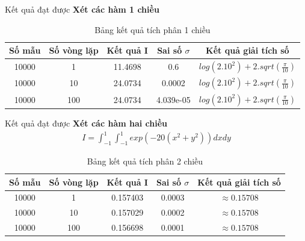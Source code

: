 \documentclass{beamer}
\begin{document}
\begin{frame}{Kết quả đạt được}\vspace{4pt}
  \textbf{Xét các hàm 1 chiều}\\
  \vspace{0.4em}
  \begin{table}[H]
    \centering
    \begin{tabular}{ |c|c|c|c|c| }
     \hline
     \multicolumn{1}{|c}{Số mẫu} & \multicolumn{1}{|c|}{Số vòng lặp} & \multicolumn{1}{|c|}{Kết quả I} & \multicolumn{1}{|c|}{Sai số $\sigma$} & \multicolumn{1}{|c|}{Kết quả giải tích số} \\
     \hline
     10000 & 1  & 11.4698 & 0.6 & $log(2.10^2) + 2.sqrt(\frac{\pi}{10})$ \\
     \hline
     10000 & 10  & 24.0734 & 0.0002 & $log(2.10^2) + 2.sqrt(\frac{\pi}{10})$ \\
     \hline
     10000 & 100  & 24.0734 & 4.039e-05 & $log(2.10^2) + 2.sqrt(\frac{\pi}{10})$ \\
     \hline
    \end{tabular}
    \caption{Bảng kết quả tích phân 1 chiều}
    \label{1d_x02505075}
   \end{table}
\end{frame}

\begin{frame}{Kết quả đạt được}\vspace{4pt}
  \textbf{Xét các hàm hai chiều}\\
  \vspace{0.4em}
  \begin{align}
    I=\int_{-1}^{1}\int_{-1}^{1} {exp(-20(x^2+y^2))}dxdy
\end{align}

\begin{table}[H]
    \centering
    \begin{tabular}{ |c|c|c|c|c| }
     \hline
     \multicolumn{1}{|c}{Số mẫu} & \multicolumn{1}{|c|}{Số vòng lặp} & \multicolumn{1}{|c|}{Kết quả I} & \multicolumn{1}{|c|}{Sai số $\sigma$} & \multicolumn{1}{|c|}{Kết quả giải tích số} \\
     \hline
     10000 & 1  & 0.157403  & 0.0003 & $\approx 0.15708$ \\
     \hline
     10000 & 10  &  0.157029 & 0.0002 & $\approx 0.15708$ \\
     \hline
     10000 & 100  & 0.156698 & 0.0001 & $\approx 0.15708$ \\
     \hline
    \end{tabular}
    \caption{Bảng kết quả tích phân 2 chiều}
    \label{2d_xy}
   \end{table}
\end{frame}
\end{document}
